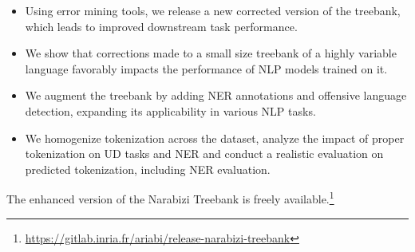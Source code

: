 \begin{itemize}
    \item Using error mining tools, we release a new corrected version
      of the treebank, which leads to improved downstream task performance.
    \item We show that corrections made to a small size treebank of a
      highly variable language favorably impacts the performance of NLP models trained on it.
    \item We augment the treebank by adding NER annotations and offensive language detection, expanding its applicability in various NLP tasks.
    \item We homogenize tokenization across the dataset, analyze the
      impact of proper tokenization on UD tasks and NER and conduct a
      realistic evaluation on predicted tokenization, including 
      NER evaluation.
\end{itemize}

The enhanced version of the Narabizi Treebank is freely available.\footnote{\url{https://gitlab.inria.fr/ariabi/release-narabizi-treebank}}